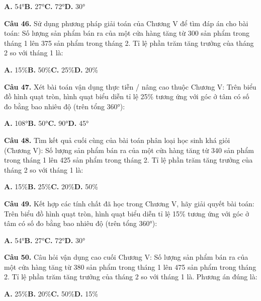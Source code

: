 \documentclass[11pt,a4paper]{article}
\begin{document}
\hspace*{1.5em}\textbf{A.} 54°\quad\quad \textbf{B.} 27°\quad\quad \textbf{C.} 72°\quad\quad \textbf{D.} 30°\par\vspace{2pt}
\textbf{\color{primary} Câu 46.} Sử dụng phương pháp giải toán của Chương V để tìm đáp án cho bài toán: Số lượng sản phẩm bán ra của một cửa hàng tăng từ 300 sản phẩm trong tháng 1 lên 375 sản phẩm trong tháng 2. Tỉ lệ phần trăm tăng trưởng của tháng 2 so với tháng 1 là:\par
\hspace*{1.5em}\textbf{A.} 15\%\quad\quad \textbf{B.} 50\%\quad\quad \textbf{C.} 25\%\quad\quad \textbf{D.} 20\%\par\vspace{2pt}
\textbf{\color{primary} Câu 47.} Xét bài toán vận dụng thực tiễn / nâng cao thuộc Chương V: Trên biểu đồ hình quạt tròn, hình quạt biểu diễn tỉ lệ 25\% tương ứng với góc ở tâm có số đo bằng bao nhiêu độ (trên tổng 360°):\par
\hspace*{1.5em}\textbf{A.} 108°\quad\quad \textbf{B.} 50°\quad\quad \textbf{C.} 90°\quad\quad \textbf{D.} 45°\par\vspace{2pt}
\textbf{\color{primary} Câu 48.} Tìm kết quả cuối cùng của bài toán phân loại học sinh khá giỏi (Chương V): Số lượng sản phẩm bán ra của một cửa hàng tăng từ 340 sản phẩm trong tháng 1 lên 425 sản phẩm trong tháng 2. Tỉ lệ phần trăm tăng trưởng của tháng 2 so với tháng 1 là:\par
\hspace*{1.5em}\textbf{A.} 15\%\quad\quad \textbf{B.} 25\%\quad\quad \textbf{C.} 20\%\quad\quad \textbf{D.} 50\%\par\vspace{2pt}
\textbf{\color{primary} Câu 49.} Kết hợp các tính chất đã học trong Chương V, hãy giải quyết bài toán: Trên biểu đồ hình quạt tròn, hình quạt biểu diễn tỉ lệ 15\% tương ứng với góc ở tâm có số đo bằng bao nhiêu độ (trên tổng 360°):\par
\hspace*{1.5em}\textbf{A.} 54°\quad\quad \textbf{B.} 27°\quad\quad \textbf{C.} 72°\quad\quad \textbf{D.} 30°\par\vspace{2pt}
\textbf{\color{primary} Câu 50.} Câu hỏi vận dụng cao cuối Chương V: Số lượng sản phẩm bán ra của một cửa hàng tăng từ 380 sản phẩm trong tháng 1 lên 475 sản phẩm trong tháng 2. Tỉ lệ phần trăm tăng trưởng của tháng 2 so với tháng 1 là. Phương án đúng là:\par
\hspace*{1.5em}\textbf{A.} 25\%\quad\quad \textbf{B.} 20\%\quad\quad \textbf{C.} 50\%\quad\quad \textbf{D.} 15\%\par\vspace{2pt}
\end{document}
